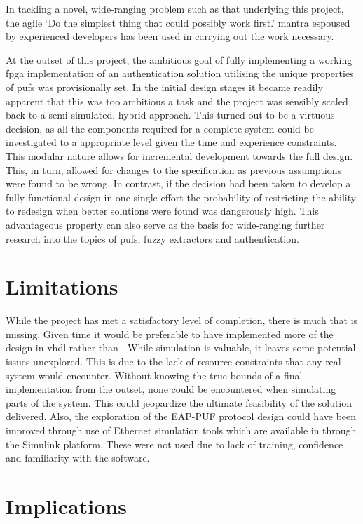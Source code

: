 In tackling a novel, wide-ranging problem such as that underlying
this project, the agile `Do the simplest thing that could possibly work first.'
mantra espoused by experienced developers\cite{beck2000extreme} has been used
in carrying out the work necessary.

At the outset of this project, the ambitious goal of fully implementing a
working \gls{fpga} implementation of an authentication solution utilising the unique
properties of \glspl{puf} was provisionally set.
In the initial design stages it became readily
apparent that this was too ambitious a task and the project was sensibly scaled
back to a semi-simulated, hybrid approach.
This turned out to be a virtuous decision, as
all the components required for a complete system could be investigated to a
appropriate level given the time and experience constraints.
This modular nature allows for incremental development towards the full design.
This, in turn, allowed for changes to the specification as previous assumptions were found
to be wrong. In contrast, if the decision had been taken to develop a fully
functional design in one single effort the probability of restricting the ability
to redesign when better solutions were found was dangerously high.
This advantageous property can also serve as the basis for wide-ranging further
research into the topics of \glspl{puf}, fuzzy extractors and authentication.

\section{Limitations}

While the project has met a satisfactory level of completion, there is much that
is missing. Given time it would be preferable to have implemented more of the
design in \gls{vhdl} rather than \matlab. While simulation is valuable, it leaves
some potential issues unexplored. This is due to the lack of resource constraints
that any real system would encounter. Without knowing the true bounds of a final
implementation from the outset, none could be encountered when simulating
parts of the system. This could jeopardize the ultimate feasibility of the solution
delivered.
Also, the exploration of the EAP-PUF
protocol design could have been improved through use of Ethernet simulation
tools which are available in \matlab through the Simulink platform. These were not
used due to lack of training, confidence and familiarity with the software.

\section{Implications}

